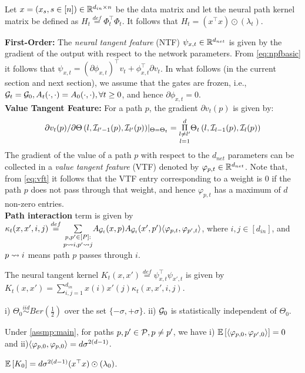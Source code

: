 \begin{lemma} Let $x=(x_s,s\in [n])\in\R^{d_{in}\times n}$ be the data matrix and let the neural path kernel matrix be defined as $H_t\stackrel{def}=\Phi^\top_t\Phi_t$. It follows that $H_t= (x^\top x)\odot(\lambda_t)$. \end{lemma}
\textbf{First-Order:} The \emph{neural tangent feature} (NTF) $\psi_{x,t}\in \R^{d_{net}}$ is given by the gradient of the output with respect to the network parameters. From \eqref{eq:npfbasic} it follows that $\psi_{x,t}=(\partial \phi_{x,t})^\top v_t +\phi^\top_{x,t}\partial v_t$. In what follows (in the current section and next section), we assume that the gates are frozen, i.e., $\G_t=\G_0, A_t(\cdot,\cdot)=A_0(\cdot,\cdot),\forall t\geq 0$, and hence $\partial \phi_{x,t}=0$.\hfill\\
\textbf{Value Tangent Feature:} For a path $p$, the gradient  $\partial v_t(p)$ is given by: \begin{align}\label{eq:vft}{\partial v_t(p)}/{\partial \Theta\left(l,\I_{l'-1}(p),\I_{l'}(p)\right)}|_{\Theta=\Theta_t}= \underset{l=1}{\underset{l\neq l'}{\overset{d}{\Pi}}} \Theta_t\left(l,\I_{l-1}(p),\I_{l}(p)\right)\end{align} The gradient of the value of a path $p$ with respect to the $d_{net}$ parameters can be collected in a \emph{value tangent feature} (VTF) denoted by $\varphi_{p,t}\in \R^{d_{net}}$. Note that, from \eqref{eq:vft} it follows that the VTF entry corresponding to a weight is $0$ if the path $p$ does not pass through that weight, and hence $\varphi_{p,t}$ has a maximum of $d$ non-zero entries.\hfill\\
\textbf{Path interaction} term is given by $\kappa_t(x,x',i,j)\stackrel{def}=\underset{p\rsa i,p'\rsa j}{\underset{{p,p'\in [P]:}}\sum} A_{\G_t}(x,p) A_{\G_t}(x',p') \ip{\varphi_{p,t}, \varphi_{p',t}}$, where $i,j\in[d_{in}]$, and $p\rsa i$ means path $p$ passes through $i$.
\begin{lemma} The {neural tangent kernel} $K_t(x,x')\stackrel{def}=\psi^\top_{x,t}\psi_{x',t}$ is given by $K_t(x,x')=\sum_{i,j=1}^{d_{in}} x(i)x'(j) \kappa_t(x,x',i,j)$.
\end{lemma}
\begin{assumption}\label{assmp:main}
i) $\Theta_0\stackrel{iid}\sim Ber\left(\frac{1}{2}\right)$ over the set $\{-\sigma,+\sigma\}$. ii) $\G_0$ is statistically independent of $\Theta_0$.
\end{assumption}
\begin{lemma}[Disentanglement]
Under \cref{assmp:main}, for paths $p,p'\in \P, p\neq p'$, we have  i) $\E{\ip{\varphi_{p,0}, \varphi_{p',0}}}= 0$ and ii)${\ip{\varphi_{p,0}, \varphi_{p,0}}}= d\sigma^{2(d-1)}$.
\end{lemma}
\begin{corollary}
$\E{K_0}=d\sigma^{2(d-1)}(x^\top x) \odot (\lambda_0)$.
\end{corollary}


